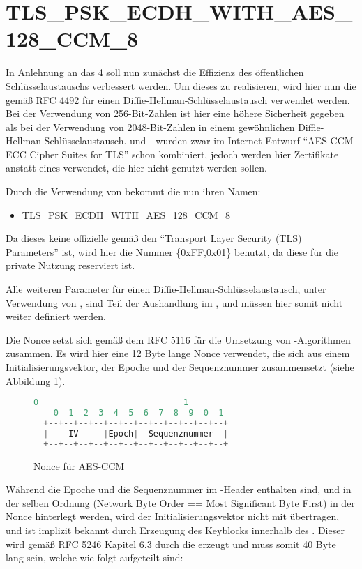 \section{TLS\_PSK\_ECDH\_WITH\_AES\_128\_CCM\_8}

In Anlehnung an das  4 soll nun zunächst die Effizienz des öffentlichen Schlüsselaustauschs verbessert werden. Um dieses zu realisieren,
wird hier nun die  gemäß RFC 4492 \cite{rfc4492} für einen Diffie-Hellman-Schlüsselaustausch verwendet werden. Bei der Verwendung von
256-Bit-Zahlen ist hier eine höhere Sicherheit gegeben als bei der Verwendung von 2048-Bit-Zahlen in einem gewöhnlichen Diffie-Hellman-Schlüsselaustausch.
 und - wurden zwar im Internet-Entwurf "`AES-CCM ECC Cipher Suites for TLS"' \cite{draftaesecc} schon kombiniert, jedoch
werden hier Zertifikate anstatt eines  verwendet, die hier nicht genutzt werden sollen.

Durch die Verwendung von  bekommt die  nun ihren Namen:
\begin{itemize}
  \item TLS\_PSK\_ECDH\_WITH\_AES\_128\_CCM\_8
\end{itemize}
Da dieses keine offizielle  gemäß den "`Transport Layer Security (TLS) Parameters"' \cite{tlsparams} ist, wird hier die Nummer
\{0xFF,0x01\} benutzt, da diese für die private Nutzung reserviert ist.

Alle weiteren Parameter für einen Diffie-Hellman-Schlüsselaustausch, unter Verwendung von , sind Teil der Aushandlung im ,
und müssen hier somit nicht weiter definiert werden.

Die Nonce setzt sich gemäß dem  RFC 5116 \cite{rfc5116} für die Umsetzung von -Algorithmen zusammen. Es wird hier eine 12 Byte lange
Nonce verwendet, die sich aus einem Initialisierungsvektor, der Epoche und der Sequenznummer zusammensetzt (siehe Abbildung \ref{fig:aes_nonce}).
\begin{figure}[ht]
  \centering
  \begin{lstlisting}[language=c]
    0                             1
    0  1  2  3  4  5  6  7  8  9  0  1
  +--+--+--+--+--+--+--+--+--+--+--+--+
  |    IV     |Epoch|  Sequenznummer  |
  +--+--+--+--+--+--+--+--+--+--+--+--+
  \end{lstlisting}
  \caption{Nonce für AES-CCM}
  \label{fig:aes_nonce}
\end{figure}
Während die Epoche und die Sequenznummer im -Header enthalten sind, und in der selben Ordnung (Network Byte Order == Most Significant
Byte First) in der Nonce hinterlegt werden, wird der Initialisierungsvektor nicht mit übertragen, und ist implizit bekannt durch Erzeugung des
Keyblocks innerhalb des . Dieser wird gemäß RFC 5246 \cite{rfc5246} Kapitel 6.3 durch die  erzeugt und muss somit
40 Byte lang sein, welche wie folgt aufgeteilt sind:

